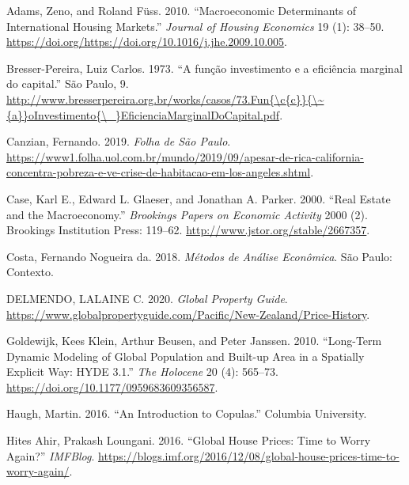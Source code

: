 \documentclass[
	12pt,				%
	oneside,			%
	a4paper,			%
	chapter=TITLE,		%
	section=TITLE,		%
	english,			%
	brazil				%
	]{abntex2}
\begin{document}
\leavevmode\hypertarget{ref-ADAMS201038}{}%
Adams, Zeno, and Roland Füss. 2010. ``Macroeconomic Determinants of International Housing Markets.'' \emph{Journal of Housing Economics} 19 (1): 38--50. \url{https://doi.org/https://doi.org/10.1016/j.jhe.2009.10.005}.

\leavevmode\hypertarget{ref-Bresser-Pereira1973}{}%
Bresser-Pereira, Luiz Carlos. 1973. ``A função investimento e a eficiência marginal do capital.'' São Paulo, 9. \href{http://www.bresserpereira.org.br/works/casos/73.Fun\%7B/c\%7Bc\%7D\%7D\%7B/~\%7Ba\%7D\%7DoInvestimento\%7B/_\%7DEficienciaMarginalDoCapital.pdf}{http://www.bresserpereira.org.br/works/casos/73.Fun\{\textbackslash{}c\{c\}\}\{\textbackslash{}\textasciitilde{}\{a\}\}oInvestimento\{\textbackslash{}\_\}EficienciaMarginalDoCapital.pdf}.

\leavevmode\hypertarget{ref-california}{}%
Canzian, Fernando. 2019. \emph{Folha de São Paulo}. \url{https://www1.folha.uol.com.br/mundo/2019/09/apesar-de-rica-california-concentra-pobreza-e-ve-crise-de-habitacao-em-los-angeles.shtml}.

\leavevmode\hypertarget{ref-Case2000}{}%
Case, Karl E., Edward L. Glaeser, and Jonathan A. Parker. 2000. ``Real Estate and the Macroeconomy.'' \emph{Brookings Papers on Economic Activity} 2000 (2). Brookings Institution Press: 119--62. \url{http://www.jstor.org/stable/2667357}.

\leavevmode\hypertarget{ref-fnogueira}{}%
Costa, Fernando Nogueira da. 2018. \emph{Métodos de Análise Econômica}. São Paulo: Contexto.

\leavevmode\hypertarget{ref-newzeland}{}%
DELMENDO, LALAINE C. 2020. \emph{Global Property Guide}. \url{https://www.globalpropertyguide.com/Pacific/New-Zealand/Price-History}.

\leavevmode\hypertarget{ref-doi:10.1177ux2f0959683609356587}{}%
Goldewijk, Kees Klein, Arthur Beusen, and Peter Janssen. 2010. ``Long-Term Dynamic Modeling of Global Population and Built-up Area in a Spatially Explicit Way: HYDE 3.1.'' \emph{The Holocene} 20 (4): 565--73. \url{https://doi.org/10.1177/0959683609356587}.

\leavevmode\hypertarget{ref-copulas}{}%
Haugh, Martin. 2016. ``An Introduction to Copulas.'' Columbia University.

\leavevmode\hypertarget{ref-fmitwa}{}%
Hites Ahir, Prakash Loungani. 2016. ``Global House Prices: Time to Worry Again?'' \emph{IMFBlog}. \url{https://blogs.imf.org/2016/12/08/global-house-prices-time-to-worry-again/}.
\end{document}
